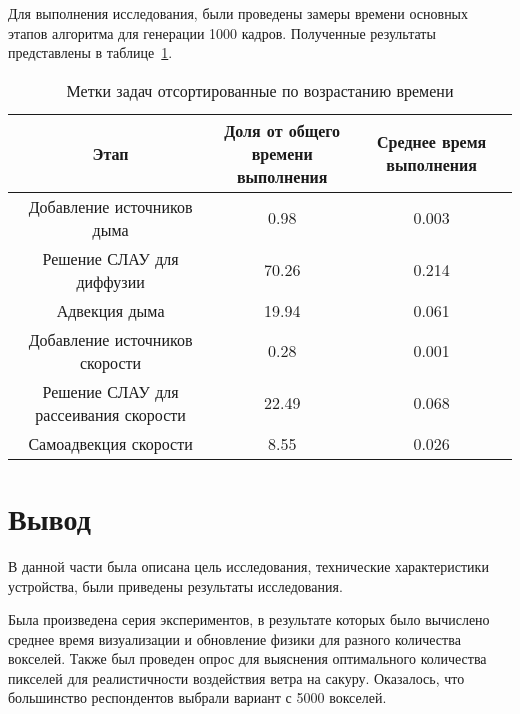 Для выполнения исследования, были проведены замеры времени основных этапов алгоритма для генерации 1000 кадров. Полученные результаты представлены в таблице~\ref{tab:no_parallel}.

\begin{table}[H]
	\caption{Метки задач отсортированные по возрастанию времени}
	\label{tab:no_parallel}
	\centering
	\begin{tabular}{|c|c|c|}
		\hline
		Этап&\shortstack{Доля от общего\\времени выполнения}&Среднее время выполнения\\\hline
		Добавление источников дыма&0.98&0.003\\\hline
		Решение СЛАУ для диффузии &70.26&0.214\\\hline
		Адвекция дыма&19.94&0.061\\\hline
		Добавление источников скорости&0.28&0.001\\\hline
		Решение СЛАУ для рассеивания скорости&22.49&0.068\\\hline
		Самоадвекция скорости&8.55&0.026\\\hline
	\end{tabular}
\end{table}



\section*{Вывод}
В данной части была описана цель исследования, технические характеристики устройства, были приведены результаты исследования.

Была произведена серия экспериментов, в результате которых было вычислено среднее время визуализации и обновление физики для разного количества вокселей. Также был проведен опрос для выяснения оптимального количества пикселей для реалистичности воздействия ветра на сакуру. Оказалось, что большинство респондентов выбрали вариант с 5000 вокселей.
